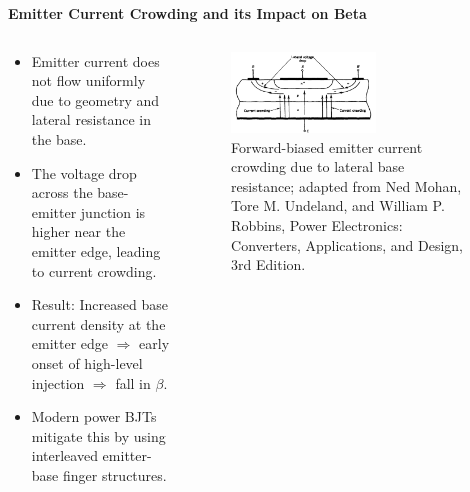\begin{frame}{\textbf{Emitter Current Crowding and its Impact on Beta}}
\begin{columns}
\begin{column}{0.6\textwidth}
\begin{itemize}
    \item Emitter current does not flow uniformly due to geometry and lateral resistance in the base.
    \item The voltage drop across the base-emitter junction is higher near the emitter edge, leading to current crowding.
    \item Result: Increased base current density at the emitter edge $\Rightarrow$ early onset of high-level injection $\Rightarrow$ fall in $\beta$.
    \item Modern power BJTs mitigate this by using interleaved emitter-base finger structures.
\end{itemize}
\end{column}

\begin{column}{0.4\textwidth}
\begin{figure}
    \centering
    \includegraphics[width=0.6\textwidth]{fig/lec04/BJT_current_crowding.png}
    \caption{Forward-biased emitter current crowding due to lateral base resistance; adapted from Ned Mohan, Tore M. Undeland, and William P. Robbins, Power Electronics: Converters, Applications, and Design, 3rd Edition.}
\end{figure}
\end{column}
\end{columns}
\end{frame}


